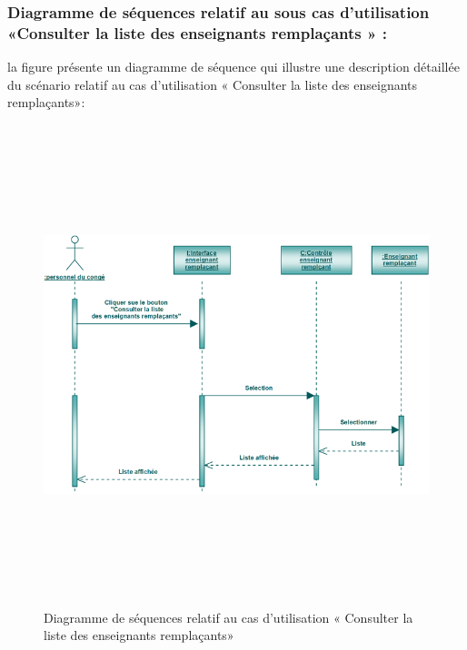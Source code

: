 \documentclass[12 pt ]{report}
\begin{document}
\subsubsection{Diagramme de séquences relatif au sous cas d’utilisation   «Consulter la liste des enseignants remplaçants » :}
la figure   présente un diagramme de séquence qui illustre une description détaillée du scénario relatif au  cas d’utilisation   « Consulter la liste des enseignants remplaçants»: 
\begin{figure}[h]
 \begin{center}
\includegraphics[width= 15 cm ,height=  14cm]{sec_rem.PNG}
\caption{Diagramme de séquences relatif au  cas d’utilisation   « Consulter la liste des enseignants remplaçants»}

\end{center}
\end{figure}
\newpage
\end{document}
